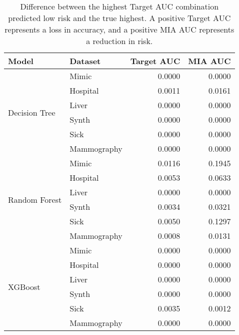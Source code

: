 \begin{table}[t]
    \caption{Difference between the highest Target AUC combination predicted low risk and the true highest. A positive Target AUC represents a loss in accuracy, and a positive MIA AUC represents a reduction in risk.}%
    \label{table:diff}
    \small
    \centering
    \begin{tabular}{llrr}
        \toprule
        {\bf Model} & {\bf Dataset} & {\bf Target AUC} & {\bf MIA AUC} \\
        \midrule
        \multirow{6}{*}{Decision Tree} 
        & Mimic & 0.0000 & 0.0000\\
        & Hospital & 0.0011 & 0.0161\\
        & Liver & 0.0000 & 0.0000\\
        & Synth & 0.0000 & 0.0000\\
        & Sick & 0.0000 & 0.0000\\
        & Mammography & 0.0000 & 0.0000\\
        \midrule
        \multirow{6}{*}{Random Forest} 
        & Mimic & 0.0116 & 0.1945\\
        & Hospital & 0.0053 & 0.0633\\
        & Liver & 0.0000 & 0.0000\\
        & Synth & 0.0034 & 0.0321\\
        & Sick & 0.0050 & 0.1297\\
        & Mammography & 0.0008 & 0.0131\\
        \midrule
        \multirow{6}{*}{XGBoost} 
        & Mimic & 0.0000 & 0.0000\\
        & Hospital & 0.0000 & 0.0000\\
        & Liver & 0.0000 & 0.0000\\
        & Synth & 0.0000 & 0.0000\\
        & Sick & 0.0035 & 0.0012\\
        & Mammography & 0.0000 & 0.0000\\
        \bottomrule
    \end{tabular}
\end{table}
